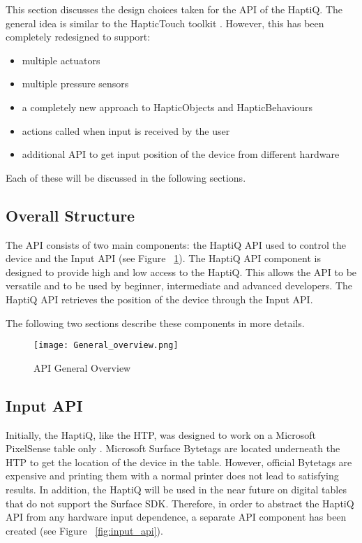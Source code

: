This section discusses the design choices taken for the API of the HaptiQ. The general idea is similar to the HapticTouch toolkit \cite{ledo2012haptictouch}. However, this has been completely redesigned to support:

\begin{itemize}
	\item multiple actuators
    \item multiple pressure sensors
    \item a completely new approach to HapticObjects and HapticBehaviours
    \item actions called when input is received by the user
    \item additional API to get input position of the device from different hardware
\end{itemize}

Each of these will be discussed in the following sections. 

\subsection{Overall Structure}

The API consists of two main components: the HaptiQ API used to control the device and the Input API (see Figure ~\ref{fig:api}). 
The HaptiQ API component is designed to provide high and low access to the HaptiQ. This allows the API to be versatile and to be used by beginner, intermediate and advanced developers. 
The HaptiQ API retrieves the position of the device through the Input API. 

The following two sections describe these components in more details.

\begin{figure}[H]
  \centering
  \texttt{[image: General\_overview.png]}
  \caption{API General Overview}
  \label{fig:api}
\end{figure}

\subsection{Input API}

Initially, the HaptiQ, like the HTP, was designed to work on a Microsoft PixelSense table only \cite{pixelsense}.
Microsoft Surface Bytetags are located underneath the HTP to get the location of the device in the table. However, official Bytetags are expensive and printing them with a normal printer does not lead to satisfying results. In addition, the HaptiQ will be used in the near future on digital tables that do not support the Surface SDK. Therefore, in order to abstract the HaptiQ API from any hardware input dependence, a separate API component has been created (see Figure ~\ref{fig:input_api}). 

